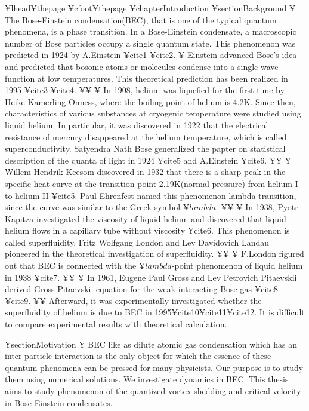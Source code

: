 ¥lhead{¥thepage}
¥cfoot{¥thepage}
¥chapter{Introduction}
¥section{Background}
¥ The Bose-Einstein condensation(BEC), that is one of the typical quantum phenomena,
is a phase transition.
In a Bose-Einstein condensate, a macroscopic number of
Bose particles occupy a single quantum state.
This phenomenon was predicted in 1924 by A.Einstein ¥cite{1} ¥cite{2}.
¥ Einstein advanced Bose's idea and predicted that bosonic atoms or molecules
condense into a single wave function at low temperatures.
This theoretical prediction has been realized in 1995 ¥cite{3} ¥cite{4}.
¥¥
¥ In 1908, helium was liquefied for the first time by Heike Kamerling Onness, 
where the boiling point of helium is 4.2K. 
Since then, characteristics of various substances at cryogenic temperature
were studied using liquid helium. 
In particular, it was discovered in 1922 that the electrical resistance of mercury
disappeared at the helium temperature, which is called superconductivity.
Satyendra Nath Bose generalized the papter on statistical description of the quanta of light in 1924 ¥cite{5} and A.Einstein ¥cite{6}.
¥¥
¥ Willem Hendrik Keesom discovered in 1932 that there is a sharp peak 
in the specific heat curve at the transition point 2.19K(normal pressure) 
from helium I to helium II ¥cite{5}. Paul Ehrenfest named this phenomenon lambda transition,
since the curve was similar to the Greek symbol $¥lambda$.
¥¥
¥ In 1938, Pyotr Kapitza investigated the viscosity of liquid helium and 
discovered that liquid helium flows in a capillary tube without viscosity ¥cite{6}.
This phenomenon is called superfluidity. Fritz Wolfgang London and Lev Davidovich Landau pioneered 
in the theoretical investigation of superfluidity.
¥¥
¥ F.London figured out that BEC is connected with 
the $¥lambda$-point phenomenon of liquid helium in 1938 ¥cite{7}.
¥¥
¥ In 1961, Eugene Paul Gross and Lev Petrovich Pitaevskii derived Gross-Pitaevskii equation for the weak-interacting Bose-gas
¥cite{8} ¥cite{9}.
¥¥ Afterward, it was experimentally investigated whether the superfluidity of helium is due to BEC in 1995¥cite{10}¥cite{11}¥cite{12}.
It is difficult to compare experimental results with theoretical calculation. 

¥section{Motivation}
¥ BEC like as dilute atomic gas condensation which has an inter-particle interaction
is the only object for which the essence of 
these quantum phenomena can be pressed for many physicists.
Our purpose is to study them using numerical solutions.
We investigate dynamics in BEC.
This thesis aims to study phenomenon of the quantized vortex shedding
and critical velocity in Bose-Einstein condensates.


